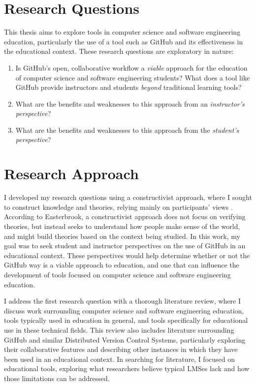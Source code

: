 
\section{Research Questions}
This thesis aims to explore tools in computer science and software engineering education, particularly the use of a tool such as GitHub and its effectiveness in the educational context. These research questions are exploratory in nature: \\
\begin{enumerate}
\item Is GitHub's open, collaborative workflow a \emph{viable} approach for the education of computer science and software engineering students? What does a tool like GitHub provide instructors and students \emph{beyond} traditional learning tools?
\item What are the benefits and weaknesses to this approach from an \emph{instructor's perspective}?
\item What are the benefits and weaknesses to this approach from the \emph{student's perspective}?
\end{enumerate}

\section{Research Approach}
I developed my research questions using a constructivist approach, where I sought to construct knowledge and theories, relying mainly on participants' views \cite{easterbrook2008selecting}. According to Easterbrook, a constructivist approach does not focus on verifying theories, but instead seeks to understand how people make sense of the world, and might build theories based on the context being studied. In this work, my goal was to seek student and instructor perspectives on the use of GitHub in an educational context. These perspectives would help determine whether or not the GitHub way is a viable approach to education, and one that can influence the development of tools focused on computer science and software engineering education.


I address the first research question with a thorough literature review, where I discuss work surrounding computer science and software engineering education, tools typically used in education in general, and tools specifically for educational use in these technical fields. This review also includes literature surrounding GitHub and similar Distributed Version Control Systems, particularly exploring their collaborative features and describing other instances in which they have been used in an educational context. In searching for literature, I focused on educational tools, exploring what researchers believe typical LMSes lack and how those limitations can be addressed.

